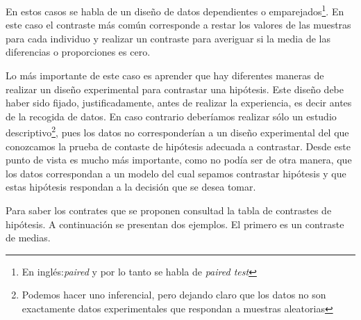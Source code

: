 \documentclass[12pt]{report}
\begin{document}
En estos casos se habla de un diseño de datos dependientes o emparejados\footnote{En inglés:\textsl{paired} y por lo tanto se habla de \textsl{paired test}}. En este caso el contraste  más común corresponde a restar los valores de las muestras para cada individuo y realizar un contraste para averiguar si la media de las diferencias o proporciones es cero.


Lo más importante de este caso es aprender que hay diferentes maneras de realizar un diseño experimental para contrastar una hipótesis. Este diseño debe haber sido fijado, justificadamente, antes de realizar la experiencia, es decir antes de  la recogida de datos. En caso contrario deberíamos realizar sólo un estudio descriptivo\footnote{Podemos hacer uno inferencial,  pero dejando claro que los datos no son exactamente datos experimentales que respondan a muestras aleatorias}, pues los datos no corresponderían a un diseño experimental del que conozcamos la  prueba de contaste de hipótesis adecuada a contrastar. Desde este punto de vista es mucho más importante, como no podía ser de otra manera, que los datos correspondan a un modelo del cual sepamos contrastar  hipótesis y que estas hipótesis respondan a la  decisión que se desea tomar.


Para saber los contrates que se proponen consultad la tabla de contrastes de hipótesis. A continuación se presentan dos ejemplos. El primero es un contraste de medias.
\end{document}
